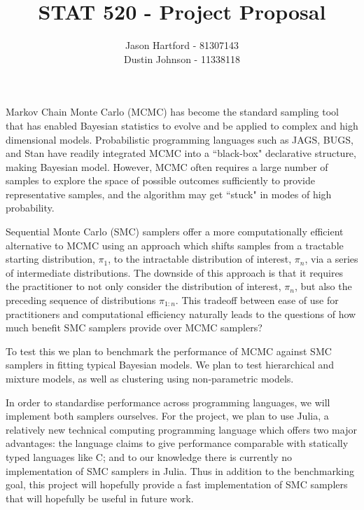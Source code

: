 \documentclass[11pt, oneside]{amsart}
\title{STAT 520 - Project Proposal}
\author{Jason Hartford - 81307143 \\
Dustin Johnson - 11338118}
\begin{document}
\maketitle



Markov Chain Monte Carlo (MCMC) has become the standard sampling tool that has enabled Bayesian statistics to evolve and be applied to complex and high dimensional models. Probabilistic programming languages such as JAGS, BUGS, and Stan have readily integrated MCMC into a ``black-box" declarative structure, making Bayesian model. However, MCMC often requires a large number of samples to explore the space of possible outcomes sufficiently to provide representative samples, and the algorithm may get ``stuck" in modes of high probability.

Sequential Monte Carlo (SMC) \cite{DelMoral2005} samplers offer a more computationally efficient alternative to MCMC using an approach which shifts samples from a tractable starting distribution, $\pi_1$, to the intractable distribution of interest, $\pi_n$, via a series of intermediate distributions. The downside of this approach is that it requires the practitioner to not only consider the distribution of interest, $\pi_n$, but also the preceding sequence of distributions $\pi_{1:n}$. This tradeoff between ease of use for practitioners and computational efficiency naturally leads to the questions of how much benefit  SMC samplers provide over MCMC samplers?

To test this we plan to benchmark the performance of MCMC against SMC samplers in fitting typical Bayesian models. We plan to test hierarchical and mixture models, as well as clustering using non-parametric models. 

In order to standardise performance across programming languages, we will implement both samplers ourselves. For the project, we plan to use Julia, a relatively new technical computing programming language which offers two major advantages: the language claims to give performance comparable with statically typed languages like C; and to our knowledge there is currently no implementation of SMC samplers in Julia. Thus in addition to the benchmarking goal, this project will hopefully provide a fast implementation of SMC samplers that will hopefully be useful in future work.


% 
\nocite{Bishop2007}
\nocite{Murphy2012}
\nocite{Lindsten2014}


\end{document}
